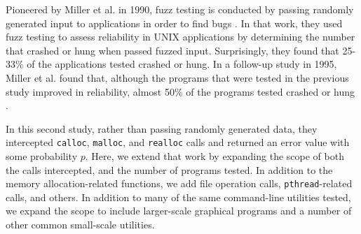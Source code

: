 Pioneered by Miller et al. in 1990, fuzz testing is conducted by passing randomly generated input to applications in order to find bugs \cite{bartoriginal}. In that work, they used fuzz testing to assess reliability in UNIX applications by determining the number that crashed or hung when passed fuzzed input. Surprisingly, they found that 25-33\% of the applications tested crashed or hung. In a follow-up study in 1995, Miller et al. found that, although the programs that were tested in the previous study improved in reliability, almost 50\% of the programs tested crashed or hung \cite{bart}.

In this second study, rather than passing randomly generated data, they intercepted \texttt{calloc}, \texttt{malloc}, and \texttt{realloc} calls and returned an error value with some probability $p$. Here, we extend that work by expanding the scope of both the calls intercepted, and the number of programs tested. In addition to the memory allocation-related functions, we add file operation calls, \texttt{pthread}-related calls, and others. In addition to many of the same command-line utilities tested, we expand the scope to include larger-scale graphical programs and a number of other common small-scale utilities.